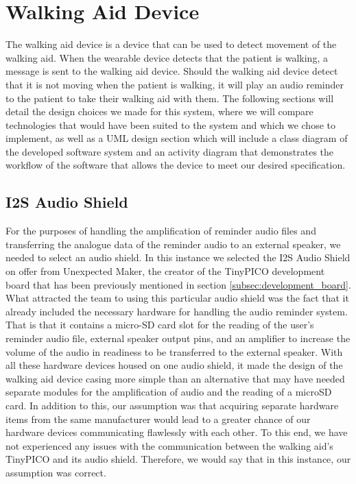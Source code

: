     \section{Walking Aid Device}
    \label{sec:walking_aid}

        The walking aid device is a device that can be used to detect movement of the walking aid. When the wearable device detects that the patient is walking, a message is sent to the walking aid device. Should the walking aid device detect that it is not moving when the patient is walking, it will play an audio reminder to the patient to take their walking aid with them. The following sections will detail the design choices we made for this system, where we will compare technologies that would have been suited to the system and which we chose to implement, as well as a UML design section which will include a class diagram of the developed software system and an activity diagram that demonstrates the workflow of the software that allows the device to meet our desired specification.

        \subsection{I2S Audio Shield}
        \label{subsec:i2s_audio_shield}

            For the purposes of handling the amplification of reminder audio files and transferring the analogue data of the reminder audio to an external speaker, we needed to select an audio shield. In this instance we selected the I2S Audio Shield \cite{unexpected_maker} on offer from Unexpected Maker, the creator of the TinyPICO development board that has been previously mentioned in section \ref{subsec:development_board}. What attracted the team to using this particular audio shield was the fact that it already included the necessary hardware for handling the audio reminder system. That is that it contains a micro-SD card slot for the reading of the user's reminder audio file, external speaker output pins, and an amplifier to increase the volume of the audio in readiness to be transferred to the external speaker. With all these hardware devices housed on one audio shield, it made the design of the walking aid device casing more simple than an alternative that may have needed separate modules for the amplification of audio and the reading of a microSD card. In addition to this, our assumption was that acquiring separate hardware items from the same manufacturer would lead to a greater chance of our hardware devices communicating flawlessly with each other. To this end, we have not experienced any issues with the communication between the walking aid's TinyPICO and its audio shield. Therefore, we would say that in this instance, our assumption was correct.
            
